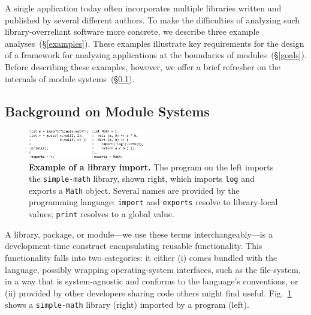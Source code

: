 \documentclass[letterpaper,twocolumn,10pt]{article}
\def\ie{{\em i.e.}, }
\newcommand{\ttt}[1]{\texttt{#1}}
\newcommand{\sx}[1]{(\S\ref{#1})}
\begin{document}
A single application today often incorporates multiple libraries written and published by several different authors.
To make the difficulties of analyzing such library-overreliant software more concrete, we describe three example analyses~\sx{examples}.
These examples illustrate key requirements for the design of a framework for analyzing applications at the boundaries of modules~\sx{goals}.
Before describing these examples, however, we offer a brief refresher on the %
  internals of module systems~\sx{bg1}.


\subsection{Background on Module Systems}
\label{bg1}

\begin{figure}[t]
\raggedleft 
\includegraphics[width=0.45\textwidth]{./figs/lya_ex1.pdf}
\caption{
  \textbf{Example of a library import.}
  \textmd{
    The program on the left imports the \ttt{simple-math} library, shown right, which imports \ttt{log} and exports a \ttt{Math} object.
    Several names are provided by the programming language:
      \ttt{import} and \ttt{exports} resolve to library-local values; \ttt{print} resolves to a global value.
  }
  \vspace{-8mm}
}
\label{fig:ex1}
\end{figure}


A library, package, or module---we use these terms interchangeably---is a development-time construct encapsulating reusable functionality.
This functionality falls into two categories:
  it either (i) comes bundled with the language, possibly wrapping operating-system interfaces, such as the file-system, in a way that is system-agnostic and conforms to the language's conventions,
  or (ii) provided by other developers sharing code others might find useful.
Fig.~\ref{fig:ex1} shows a \ttt{simple-math} library (right) imported by a program (left).
\end{document}
